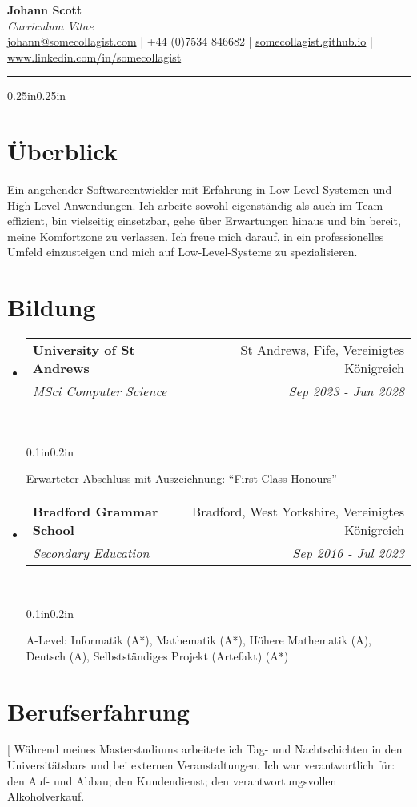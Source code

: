 \documentclass[a4paper]{article}
\makeatletter
\newcommand{\emailaddr}{johann@somecollagist.com}
\newcommand{\website}{somecollagist.github.io}
\newcommand{\linkedin}{www.linkedin.com/in/somecollagist}
\newcommand{\resumeSubheading}[5][]{
  \vspace{2pt}\item
    \begin{tabular*}{0.875\textwidth}[t]{l@{\extracolsep{\fill}}r}
      \textbf{#2} & #3 \\
      \textit{\small#4} & \textit{\small #5} \\
    \end{tabular*}\\
    \vspace{-5pt}
    \begin{adjustwidth}{0.1in}{0.2in}
      #1
    \end{adjustwidth}
    \vspace{10pt}
}
\newcommand{\resumeSubheadingList}[1]{
  \begin{itemize}
    #1
  \end{itemize}
}
\makeatother
\begin{document}
\begin{center}
  \huge \textbf{Johann Scott} \\
  \normalsize \textit{Curriculum Vitae} \\
  \vspace{1em}
  {
    \href{mailto:\emailaddr}{\emailaddr} {|}
    +44 (0)7534 846682 {|}
    \href{https://\website}{\website} {|}
    \href{https://\linkedin}{\linkedin}
  } \\
  \vspace{1em}
  \rule{\linewidth}{1pt}
\end{center}

\begin{adjustwidth}{0.25in}{0.25in}

  \section{Überblick}
  Ein angehender Softwareentwickler mit Erfahrung in Low-Level-Systemen und
  High-Level-Anwendungen. Ich arbeite sowohl eigenständig als auch im Team
  effizient, bin vielseitig einsetzbar, gehe über Erwartungen hinaus und bin
  bereit, meine Komfortzone zu verlassen. Ich freue mich darauf, in ein
  professionelles Umfeld einzusteigen und mich auf Low-Level-Systeme zu
  spezialisieren.

  \section{Bildung}
    \resumeSubheadingList{
      \resumeSubheading[
        Erwarteter Abschluss mit Auszeichnung: ``First Class Honours''
      ]
        {University of St Andrews}
        {St Andrews, Fife, Vereinigtes Königreich}
        {MSci Computer Science}
        {Sep 2023 {-} Jun 2028}
      \resumeSubheading[
        A-Level: Informatik (A*), Mathematik (A*), Höhere
        Mathematik (A), Deutsch (A), Selbstständiges Projekt (Artefakt) (A*)
      ]
        {Bradford Grammar School}
        {Bradford, West Yorkshire, Vereinigtes Königreich}
        {Secondary Education}
        {Sep 2016 {-} Jul 2023}
    }

  \section{Berufserfahrung}
    \resumeSubheadingList{
      \resumeSubheading[
        Während meines Masterstudiums arbeitete ich Tag- und Nachtschichten in
        den Universitätsbars und bei externen Veranstaltungen. Ich war
        verantwortlich für: den Auf- und Abbau; den Kundendienst; den
        verantwortungsvollen Alkoholverkauf.

}
\end{adjustwidth}
\end{document}
